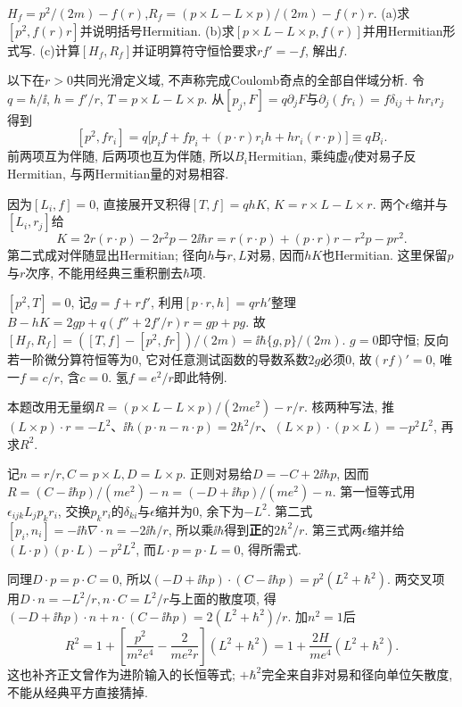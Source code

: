 \begin{exercise}
$H_f=p^2/(2m)-f(r)$,$R_f=(p\times L-L\times p)/(2m)-f(r)r$. (a)求$[p^2,f(r)r]$并说明括号Hermitian. (b)求$[p\times L-L\times p,f(r)]$并用Hermitian形式写. (c)计算$[H_f,R_f]$并证明算符守恒恰要求$rf'=-f$, 解出$f$.
\end{exercise}
\begin{solution}
以下在$r>0$共同光滑定义域, 不声称完成Coulomb奇点的全部自伴域分析. 令$q=\hbar/\ii$, $h=f'/r$, $T=p\times L-L\times p$. 从$[p_j,F]=q\partial_jF$与$\partial_j(fr_i)=f\delta_{ij}+hr_ir_j$得到
\[
[p^2,fr_i]=q\big[p_if+fp_i+(p\cdot r)r_ih+hr_i(r\cdot p)\big]\equiv qB_i.
\]
前两项互为伴随, 后两项也互为伴随, 所以$B_i$Hermitian, 乘纯虚$q$使对易子反Hermitian, 与两Hermitian量的对易相容.

因为$[L_i,f]=0$, 直接展开叉积得$[T,f]=qhK$, $K=r\times L-L\times r$. 两个$\epsilon$缩并与$[L_i,r_j]$给
\[
K=2r(r\cdot p)-2r^2p-2\ii\hbar r
=r(r\cdot p)+(p\cdot r)r-r^2p-pr^2.
\]
第二式成对伴随显出Hermitian; 径向$h$与$r,L$对易, 因而$hK$也Hermitian. 这里保留$p$与$r$次序, 不能用经典三重积删去$\hbar$项.

$[p^2,T]=0$, 记$g=f+rf'$, 利用$[p\cdot r,h]=qrh'$整理$B-hK=2gp+q(f''+2f'/r)r=gp+pg$. 故$[H_f,R_f]=([T,f]-[p^2,fr])/(2m)=\ii\hbar\{g,p\}/(2m)$. $g=0$即守恒; 反向若一阶微分算符恒等为0, 它对任意测试函数的导数系数$2g$必须0, 故$(rf)'=0$, 唯一$f=c/r$, 含$c=0$. 氢$f=e^2/r$即此特例.
\end{solution}
\begin{exercise}
本题改用无量纲$R=(p\times L-L\times p)/(2me^2)-r/r$. 核两种写法, 推$(L\times p)\cdot r=-L^2$、$\ii\hbar(p\cdot n-n\cdot p)=2\hbar^2/r$、$(L\times p)\cdot(p\times L)=-p^2L^2$, 再求$R^2$.
\end{exercise}
\begin{solution}
记$n=r/r,C=p\times L,D=L\times p$. 正则对易给$D=-C+2\ii\hbar p$, 因而$R=(C-\ii\hbar p)/(me^2)-n=(-D+\ii\hbar p)/(me^2)-n$. 第一恒等式用$\epsilon_{ijk}L_jp_kr_i$, 交换$p_kr_i$的$\delta_{ki}$与$\epsilon$缩并为0, 余下为$-L^2$. 第二式$[p_i,n_i]=-\ii\hbar\nabla\cdot n=-2\ii\hbar/r$, 所以乘$\ii\hbar$得到\textbf{正}的$2\hbar^2/r$. 第三式两$\epsilon$缩并给$(L\cdot p)(p\cdot L)-p^2L^2$, 而$L\cdot p=p\cdot L=0$, 得所需式.

同理$D\cdot p=p\cdot C=0$, 所以$(-D+\ii\hbar p)\cdot(C-\ii\hbar p)=p^2(L^2+\hbar^2)$. 两交叉项用$D\cdot n=-L^2/r,n\cdot C=L^2/r$与上面的散度项, 得$(-D+\ii\hbar p)\cdot n+n\cdot(C-\ii\hbar p)=2(L^2+\hbar^2)/r$. 加$n^2=1$后
\[
R^2=1+\left[\frac{p^2}{m^2e^4}-\frac2{me^2r}\right](L^2+\hbar^2)
=1+\frac{2H}{me^4}(L^2+\hbar^2).
\]
这也补齐正文曾作为进阶输入的长恒等式; $+\hbar^2$完全来自非对易和径向单位矢散度, 不能从经典平方直接猜掉.
\end{solution}

